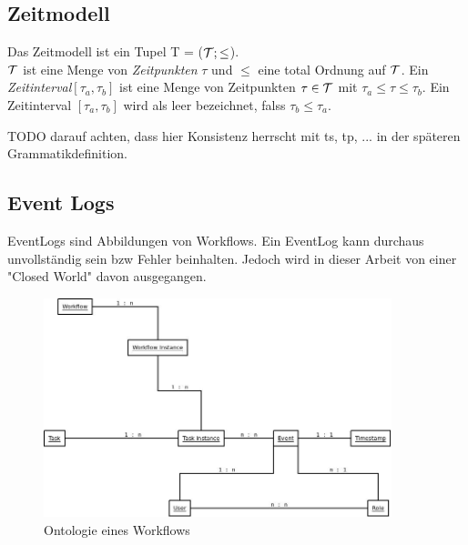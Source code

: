\cite{wolter_modeling_of_TBAC_in_BPMN}

\subsection{Zeitmodell}
Das Zeitmodell ist ein Tupel T = ($\mathcal{T};\leq$).\\
$\mathcal{T}$ ist eine Menge von \textit{Zeitpunkten} $\tau$ und $\leq$ eine total Ordnung auf $\mathcal{T}$.
Ein \textit{Zeitinterval}$[\tau_a, \tau_b]$ ist eine Menge von Zeitpunkten $\tau \in \mathcal{T}$ mit $\tau_a \leq \tau \leq \tau_b$.
Ein Zeitinterval $[\tau_a, \tau_b]$ wird als leer bezeichnet, falss $\tau_b \leq \tau_a$.


TODO darauf achten, dass hier Konsistenz herrscht mit ts, tp, ... in der späteren Grammatikdefinition.
\cite{warner_inter_instance}

\subsection{Event Logs}

EventLogs sind Abbildungen von Workflows. Ein EventLog kann durchaus unvollständig sein bzw Fehler beinhalten. Jedoch wird in dieser Arbeit von einer "Closed World" davon ausgegangen.


\begin{figure}[ht]
	\centering
  \includegraphics[width=0.9\textwidth]{Figures/WorkflowOntology}
	\caption{Ontologie eines Workflows}
	\label{fig:ontology}
\end{figure}


